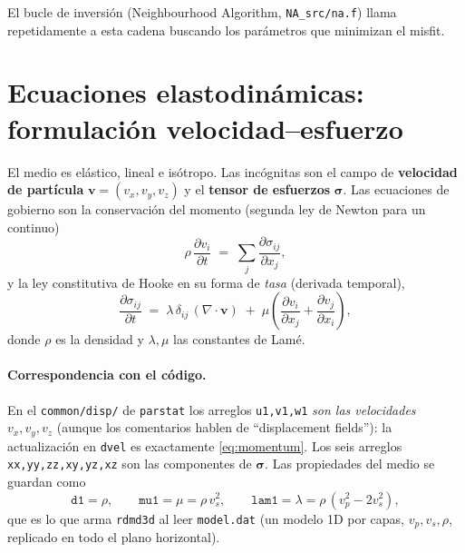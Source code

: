 \documentclass[11pt,a4paper]{article}
\newcommand{\pd}[2]{\frac{\partial #1}{\partial #2}}
\begin{document}
El bucle de inversión (Neighbourhood Algorithm, \texttt{NA\_src/na.f}) llama
repetidamente a esta cadena buscando los parámetros que minimizan el misfit.

\section{Ecuaciones elastodinámicas: formulación velocidad--esfuerzo}

El medio es elástico, lineal e isótropo. Las incógnitas son el campo de
\textbf{velocidad de partícula} $\mathbf{v}=(v_x,v_y,v_z)$ y el \textbf{tensor de
esfuerzos} $\boldsymbol\sigma$. Las ecuaciones de gobierno son la conservación
del momento (segunda ley de Newton para un continuo)
\begin{equation}
  \rho\,\pd{v_i}{t} \;=\; \sum_j \pd{\sigma_{ij}}{x_j},
  \label{eq:momentum}
\end{equation}
y la ley constitutiva de Hooke en su forma de \emph{tasa} (derivada temporal),
\begin{equation}
  \pd{\sigma_{ij}}{t}
  \;=\; \lambda\,\delta_{ij}\,(\nabla\!\cdot\!\mathbf{v})
      \;+\; \mu\!\left(\pd{v_i}{x_j}+\pd{v_j}{x_i}\right),
  \label{eq:hooke}
\end{equation}
donde $\rho$ es la densidad y $\lambda,\mu$ las constantes de Lamé.

\paragraph{Correspondencia con el código.}
En el \texttt{common/disp/} de \texttt{parstat} los arreglos \texttt{u1,v1,w1}
\emph{son las velocidades} $v_x,v_y,v_z$ (aunque los comentarios hablen de
``displacement fields''): la actualización en \texttt{dvel} es exactamente
\eqref{eq:momentum}. Los seis arreglos \texttt{xx,yy,zz,xy,yz,xz} son las
componentes de $\boldsymbol\sigma$. Las propiedades del medio se guardan como
\begin{equation}
  \texttt{d1}=\rho,\qquad
  \texttt{mu1}=\mu=\rho\,v_s^2,\qquad
  \texttt{lam1}=\lambda=\rho\,(v_p^2-2v_s^2),
\end{equation}
que es lo que arma \texttt{rdmd3d} al leer \texttt{model.dat} (un modelo 1D por
capas, $v_p,v_s,\rho$, replicado en todo el plano horizontal).

\end{document}
